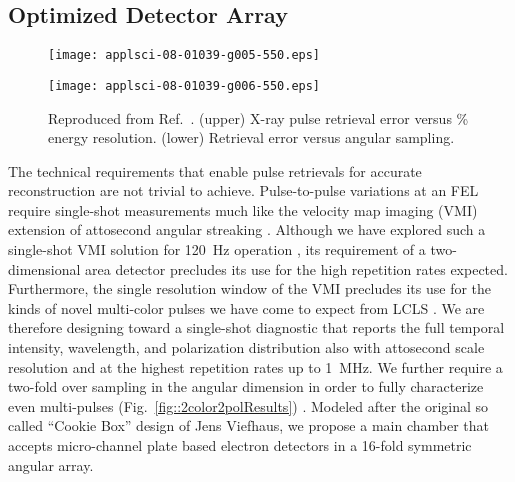 \subsection*{Optimized Detector Array}
%

\begin{wrapfigure}[26]{r}{3in}
\vspace{-3\baselineskip}
\centerline{\texttt{[image: applsci-08-01039-g005-550.eps]}}
\centerline{\texttt{[image: applsci-08-01039-g006-550.eps]}}
\vspace{-1\baselineskip}
\caption{\label{fig::thomasfigs}Reproduced from Ref.~\cite{Feurer2018}. (upper) X-ray pulse retrieval error versus \% energy resolution.  
(lower) Retrieval error versus angular sampling.}
\end{wrapfigure}

The technical requirements that enable pulse retrievals for accurate reconstruction are not trivial to achieve.
Pulse-to-pulse variations at an FEL require single-shot measurements much like the velocity map imaging (VMI) \cite{VrakkingRSI} extension of attosecond angular streaking \cite{attoclockVMI2013}.
Although we have explored such a single-shot VMI solution for 120~Hz operation \cite{Siqi2018}, its requirement of a two-dimensional area detector precludes its use for the high repetition rates expected. 
Furthermore, the single resolution window of the VMI precludes its use for the kinds of novel multi-color pulses we have come to expect from LCLS \cite{Lutman13_twocolor,Marinelli13_twocolor,Marinelli2015,Lutman2016,LutmanFreshSlice2016}.
We are therefore designing toward a single-shot diagnostic that reports the full temporal intensity, wavelength, and polarization distribution also with attosecond scale resolution and at the highest repetition rates up to 1~MHz.  
We further require a two-fold over sampling in the angular dimension in order to fully characterize even multi-pulses (Fig.~\ref{fig::2color2polResults}) \cite{Lutman2016,LutmanFreshSlice2016}.
Modeled after the original so called ``Cookie Box'' design of Jens Viefhaus, we propose a main chamber that accepts micro-channel plate based electron detectors in a 16-fold symmetric angular array.

